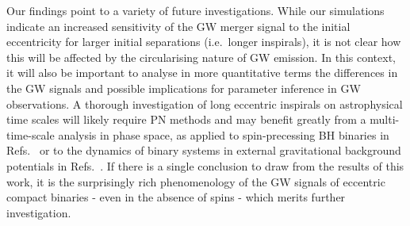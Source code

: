 %
Our findings point to a variety of future investigations. While our
simulations indicate an increased sensitivity of the GW merger signal
to the initial eccentricity for larger initial separations
(i.e.~longer inspirals), it is not clear how this will be affected by
the circularising nature of GW emission. In this context, it will also
be important to analyse in more quantitative terms the differences in
the GW signals and possible implications for parameter inference in GW
observations. A thorough investigation of long eccentric inspirals on
astrophysical time scales will likely require PN methods and may
benefit greatly from a multi-time-scale analysis in phase space, as
applied to spin-precessing BH binaries in
Refs.~\cite{Kesden:2014sla,Gerosa:2015tea} or to the dynamics of
binary systems in external gravitational background potentials in
Refs.~\cite{Hamilton:2019a,Hamilton:2019b}. If there is a single
conclusion to draw from the results of this work, it is the
surprisingly rich phenomenology of the GW signals of eccentric compact
binaries - even in the absence of spins - which merits further investigation.


